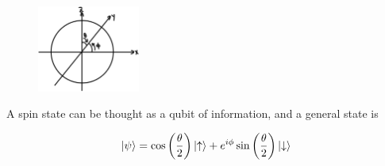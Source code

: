 \documentclass[12pt]{book} %
\numberwithin{equation}{chapter}
\begin{document}
\begin{figure}
\centering
\includegraphics[width=0.3\textwidth]{Bloch sphere}
\end{figure}

\noindent A spin state can be thought as a qubit of information, and a general state is
\begin{eqnbox}
\begin{align}
\ket{\psi}=\cos\left(\frac{\theta}{2}\right)\ket{\uparrow}+e^{i\phi}\sin\left(\frac{\theta}{2}\right)\ket{\downarrow}
\end{align}
\end{eqnbox}
\end{document}
